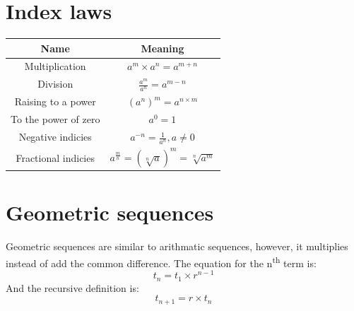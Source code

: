 \documentclass[a4paper,10pt]{report}
\begin{document}
\section{Index laws}
\begin{center}
	\begin{tabular}{c|c}
		Name                 & Meaning                                             \\ \hline
		Multiplication       & $a^m \times a^n = a^{m + n}$                        \\
		Division             & $\frac{a^m}{a^n} = a^{m - n}$                       \\
		Raising to a power   & $(a^n)^m = a^{n \times m}$                          \\
		To the power of zero & $a^0 = 1$                                           \\
		Negative indicies    & $a^{-n} = \frac{1}{a^n}, a \not = 0$                \\
		Fractional indicies  & $a^{\frac{m}{n}} = (\sqrt[n]{a})^m = \sqrt[n]{a^m}$
	\end{tabular}
\end{center}

\section{Geometric sequences}
Geometric sequences are similar to arithmatic sequences, however, it multiplies instead of add the common difference.  The equation for the n\textsuperscript{th} term is:
$$
    t_n = t_1 \times r^{n - 1}
$$
And the recursive definition is:
$$
    t_{n + 1} = r \times t_n
$$
\end{document}
